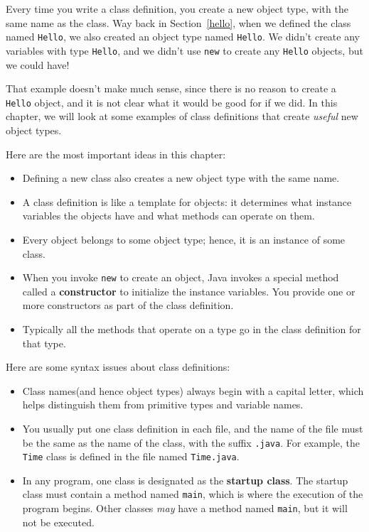 \documentclass{book}
\begin{document}
Every time you write a class definition, you create a new
object type, with the same name as the class.  Way back in
Section~\ref{hello}, when we defined the class named {\tt Hello},
we also created an object type named {\tt Hello}.  We
didn't create any variables with type {\tt Hello}, and we
didn't use {\tt new} to create any {\tt Hello}
objects, but we could have!

That example doesn't make much sense, since there is no
reason to create a {\tt Hello} object, and it is not clear
what it would be good for if we did.  In this chapter, we
will look at some examples of class definitions that create
{\em useful} new object types.

Here are the most important ideas in this chapter:

\begin{itemize}

\item Defining a new class also creates a new object type
with the same name.

\item A class definition is like a template for objects:
it determines what instance variables the objects have and
what methods can operate on them.

\item Every object belongs to some object type; hence, it
is an instance of some class.

\item When you invoke {\tt new} to create an object, Java
invokes a special method called a {\bf constructor} to initialize the
instance variables.  You provide one or more constructors as part of
the class definition.

\item Typically all the methods that operate on a type go in the
class definition for that type.

\end{itemize}

Here are some syntax issues about class definitions:

\begin{itemize}

\item Class names(and hence object types) always begin with a capital
letter, which helps distinguish them from primitive types and variable
names.

\item You usually put one class definition in each file, and the name
of the file must be the same as the name of the class, with the suffix
{\tt .java}.  For example, the {\tt Time} class is defined in the file
named {\tt Time.java}.

\item In any program, one class is designated as the {\bf startup
class}.  The startup class must contain a method named {\tt main}, which
is where the execution of the program begins.  Other classes {\em may}
have a method named {\tt main}, but it will not be executed.

\end{itemize}
\end{document}
